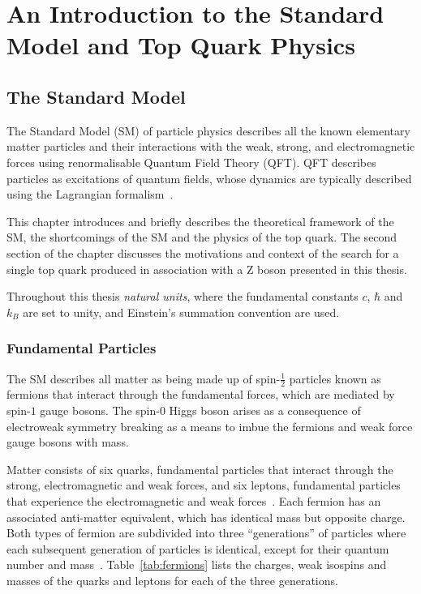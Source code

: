 \chapter{An Introduction to the Standard Model and Top Quark Physics}\label{chapter:theory}
\section{The Standard Model}\label{sec:sm}
The Standard Model (SM) of particle physics describes all the known elementary matter particles and their interactions with the weak, strong, and electromagnetic forces using renormalisable Quantum Field Theory (QFT).
QFT describes particles as excitations of quantum fields, whose dynamics are typically described using the Lagrangian formalism~\cite{LagrangiansSM}.

This chapter introduces and briefly describes the theoretical framework of the SM, the shortcomings of the SM and the physics of the top quark.
The second section of the chapter discusses the motivations and context of the search for a single top quark produced in association with a Z boson presented in this thesis.

Throughout this thesis \emph{natural units}, where the fundamental constants $c$, $\hbar$ and $k_{B}$ are set to unity, and Einstein's summation convention are used.

\subsection{Fundamental Particles}\label{subsec:particles}
The SM describes all matter as being made up of spin-$\frac{1}{2}$ particles known as fermions that interact through the fundamental forces, which are mediated by spin-$1$ gauge bosons.
The spin-$0$ Higgs boson arises as a consequence of electroweak symmetry breaking as a means to imbue the fermions and weak force gauge bosons with mass.

Matter consists of six quarks, fundamental particles that interact through the strong, electromagnetic and weak forces, and six leptons, fundamental particles that experience the electromagnetic and weak forces~\cite{LagrangiansSM}.
Each fermion has an associated anti-matter equivalent, which has identical mass but opposite charge.
Both types of fermion are subdivided into three ``generations'' of particles where each subsequent generation of particles is identical, except for their quantum number and mass~\cite{ElectroweakStrong}.
Table~\ref{tab:fermions} lists the charges, weak isospins and masses of the quarks and leptons for each of the three generations.

